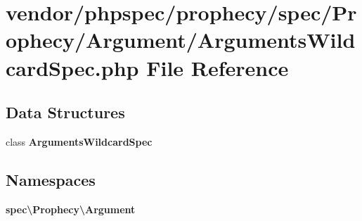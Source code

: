 \section{vendor/phpspec/prophecy/spec/\+Prophecy/\+Argument/\+Arguments\+Wildcard\+Spec.php File Reference}
\label{_arguments_wildcard_spec_8php}
\subsection*{Data Structures}
\begin{DoxyCompactItemize}
\item 
class {\bf Arguments\+Wildcard\+Spec}
\end{DoxyCompactItemize}
\subsection*{Namespaces}
\begin{DoxyCompactItemize}
\item 
 {\bf spec\textbackslash{}\+Prophecy\textbackslash{}\+Argument}
\end{DoxyCompactItemize}
